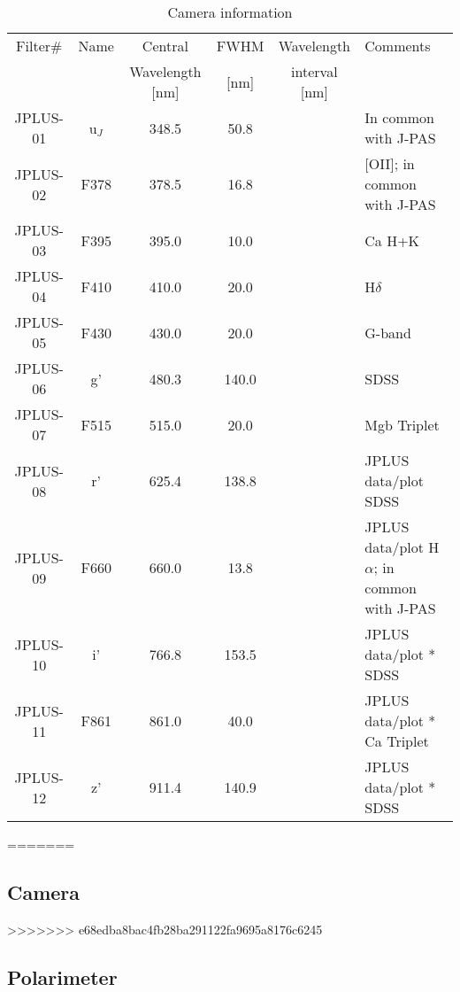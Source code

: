 \documentclass[12pt,preprint]{aastex}
\begin{document}
\begin{table*}
 \centering
   \label{table:result}
    \begin{minipage}{140mm}
\scriptsize
\caption{Camera information}   
                       
\begin{tabular}{c c c c c l}     %
\hline\hline   


Filter$\#$ & Name &  Central                   & FWHM     & Wavelength   &  Comments \\
           &            & Wavelength [nm]    & [nm]          & interval [nm]  &  \\
\hline

JPLUS-01 &	u$_J$ &	348.5 & 50.8	 &  & 	In common with J-PAS \\
JPLUS-02 &	F378 &	 378.5 &	16.8 &	& 	[OII]; in common with J-PAS \\
JPLUS-03 &	F395 &	395.0 &	10.0 &   &	Ca H+K \\
JPLUS-04 &	F410 &	410.0 &	20.0 &	& 	H$\delta$ \\
JPLUS-05 &	F430 &	430.0 &	20.0 &	&	G-band \\
JPLUS-06 &	 g'    & 	480.3 &	140.0 &	& 	SDSS \\
JPLUS-07 &	F515 &	515.0 &	20.0 &	& 	Mgb Triplet \\
JPLUS-08 &	r'	  & 625.4  &	138.8 &	 &	JPLUS data/plot	SDSS \\
JPLUS-09 &	F660 &	660.0 &	13.8	 & & 	JPLUS data/plot	H$\alpha$; in common with J-PAS \\
JPLUS-10 &	i' &	 766.8 &	153.5 &	 & 	JPLUS data/plot *	SDSS \\
JPLUS-11 &	F861 &	861.0 &	40.0 &	& 	JPLUS data/plot *	Ca Triplet \\
JPLUS-12 &	z'  &	 911.4 &	140.9	&  & 	JPLUS data/plot *	SDSS \\

\hline                  
\end{tabular}
\end{minipage}
\end{table*}   





=======

\subsection{Camera}

>>>>>>> e68edba8bac4fb28ba291122fa9695a8176c6245
\subsection{Polarimeter}
\end{document}
